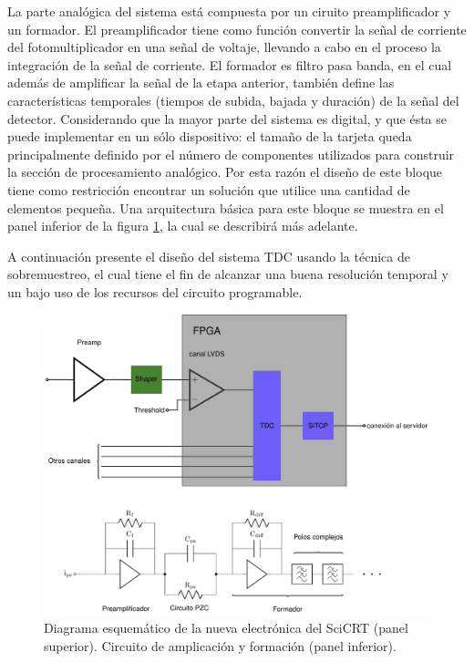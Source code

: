 La parte analógica del sistema está compuesta por un ciruito preamplificador y un formador. El preamplificador tiene como función convertir la señal de corriente del fotomultiplicador en una señal de voltaje, llevando a cabo en el proceso la integración de la señal de corriente. El formador es filtro pasa banda, en el cual además de amplificar la señal de la etapa anterior, también define las características temporales (tiempos de subida, bajada y duración) de la señal del detector. Considerando que la mayor parte del sistema es digital, y que ésta se puede implementar en un sólo dispositivo: el tamaño de la tarjeta queda principalmente definido por el número de componentes utilizados para construir la sección de procesamiento analógico. Por esta razón el diseño de este bloque tiene como restricción encontrar un solución que utilice una cantidad de elementos pequeña. Una arquitectura básica para este bloque se muestra en el panel inferior de la figura \ref{fig:nfeb-prot}, la cual se describirá más adelante.

A continuación presente el diseño del sistema TDC usando la técnica de sobremuestreo,  el cual tiene el fin de alcanzar una buena resolución temporal y un bajo uso de los recursos del circuito programable.

\begin{figure}
        \centering
        \includegraphics[width=\textwidth]{nfeb-prot.pdf}
        \caption{Diagrama esquemático de la nueva electrónica del SciCRT (panel superior). Circuito de amplicación y formación (panel inferior).}
        \label{fig:nfeb-prot}
\end{figure}

